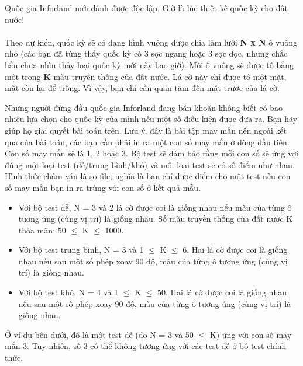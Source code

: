 Quốc gia Inforland mới dành được độc lập. Giờ là lúc thiết kế quốc kỳ cho đất nước!   
\\
\\   Theo dự kiến, quốc kỳ sẽ có dạng hình vuông được chia làm lưới   \textbf{    N x N   }   ô vuông nhỏ (các bạn đã từng thấy quốc kỳ có 3 sọc ngang hoặc 3 sọc dọc, nhưng chắc hẳn chưa nhìn thấy loại quốc kỳ mới này bao giờ). Mỗi ô vuông sẽ được tô bằng một trong   \textbf{    K   }   màu truyền thống của đất nước. Lá cờ này chỉ được tô một mặt, mặt còn lại để trống. Vì vậy, bạn chỉ cần quan tâm đến mặt trước của lá cờ.  

   Những người đứng đầu quốc gia Inforland đang băn khoăn không biết có bao nhiêu lựa chọn cho quốc kỳ của mình nếu một số điều kiện được đưa ra. Bạn hãy giúp họ giải quyết bài toán trên. Lưu ý, đây là bài tập may mắn nên ngoài kết quả của bài toán, các bạn cần phải in ra một con số may mắn ở dòng đầu tiên. Con số may mắn sẽ là 1, 2 hoặc 3. Bộ test sẽ đảm bảo rằng mỗi con số sẽ ứng với đúng một loại test (dễ/trung bình/khó) và mỗi loại test sẽ có số điểm như nhau. Hình thức chấm vẫn là so file, nghĩa là bạn chỉ được điểm cho một test nếu con số may mắn bạn in ra trùng với con số ở kết quả mẫu.  
\begin{itemize}
	\item     Với bộ test dễ, N = 3 và 2 lá cờ được coi là giống nhau nếu màu của từng ô tương ứng (cùng vị trí) là giống nhau. Số màu truyền thống của đất nước K thỏa mãn: 50  $\le$  K  $\le$  1000.   
\end{itemize}
\begin{itemize}
	\item     Với bộ test trung bình, N = 3 và 1  $\le$  K  $\le$  6. Hai lá cờ được coi là giống nhau nếu sau một số phép xoay 90 độ, màu của từng ô tương ứng (cùng vị trí) là giống nhau.   
\end{itemize}
\begin{itemize}
	\item     Với bộ test khó, N = 4 và 1  $\le$  K  $\le$  50. Hai lá cờ được coi là giống nhau nếu sau một số phép xoay 90 độ, màu của từng ô tương ứng (cùng vị trí) là giống nhau.   
\end{itemize}

   Ở ví dụ bên dưới, đó là một test dễ (do N = 3 và 50  $\le$  K) ứng với con số may mắn 3. Tuy nhiên, số 3 có thể không tương ứng với các test dễ ở bộ test chính thức.  

\